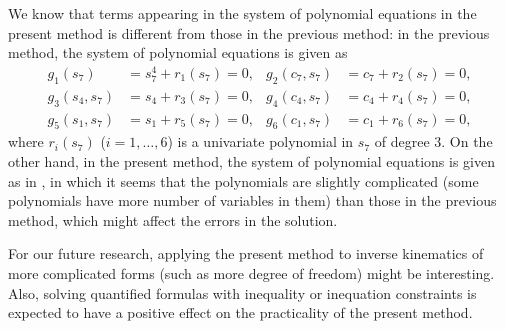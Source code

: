 \documentclass{birkjour}
\theoremstyle{plain}
\theoremstyle{definition}
\begin{document}
\begin{enumerate}
        We know that terms appearing in the system of polynomial equations in the present method 
        is different from those in the previous method: 
        in the previous method, the system of polynomial equations is given as
        \begin{align*}
            g_1(s_7) &= s_7^4 + r_1(s_7) = 0, & g_2(c_7,s_7) &= c_7 + r_2(s_7) = 0, \\
            g_3(s_4,s_7) &= s_4 + r_3(s_7) = 0, & g_4(c_4,s_7) &= c_4 + r_4(s_7) = 0, \\
            g_5(s_1,s_7) &= s_1 + r_5(s_7) = 0, & g_6(c_1,s_7) &= c_1 + r_6(s_7) = 0,
        \end{align*}
        where $r_i(s_7)$ ($i=1,\dots,6$) is a univariate polynomial in $s_7$ of degree 3.
        On the other hand, in the present method, the system of polynomial equations is given as in 
        , in which it seems that the polynomials are slightly complicated 
        (some polynomials have more number of variables in them) than those in the previous method,
        which might affect the errors in the solution.
    \end{enumerate}
    
    For our future research, applying the present method to inverse kinematics of 
    more complicated forms (such as more degree of freedom) might be interesting.
    Also, solving quantified formulas with inequality or inequation constraints is expected to 
    have a positive effect on the practicality of the present method.
    

\end{document}
